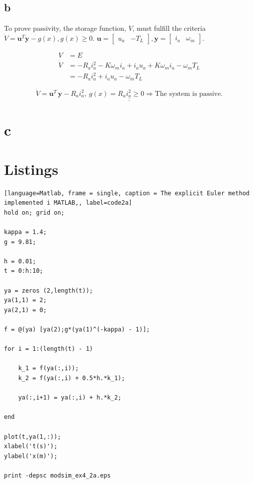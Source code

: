 \documentclass{article}
\begin{document}
\subsection{b}
To prove passivity, the storage function, $V$, must fulfill the criteria $\dot V = \mathbf{u}^T\mathbf{y} - g(x), g(x) \geq 0$. $\mathbf{u} = \begin{bmatrix} u_a & -T_L\end{bmatrix}, \mathbf{y} = \begin{bmatrix} i_a & \omega_m\end{bmatrix}$.

\begin{align*}
	V &= E\\
	\dot V &= -R_ai_a^2 - K\omega_mi_a + i_au_a+K\omega_mi_a - \omega_mT_L\\
	&= -R_ai_a^2 + i_au_a - \omega_mT_L
	
\end{align*}

\begin{equation*}
	\underline{\underline{\dot V =\mathbf{u}^T\,\mathbf{y} - R_ai_a^2, \: g(x) = R_ai_a^2 \geq 0 \Rightarrow \text{The system is passive.}}}
\end{equation*}

\section{c}


\section{Listings}


\begin{lstlisting}[language=Matlab, frame = single, caption = The explicit Euler method implemented i MATLAB,, label=code2a]
hold on; grid on;

kappa = 1.4;
g = 9.81;

h = 0.01;
t = 0:h:10;

ya = zeros (2,length(t));
ya(1,1) = 2;
ya(2,1) = 0;

f = @(ya) [ya(2);g*(ya(1)^(-kappa) - 1)];

for i = 1:(length(t) - 1)
    
    k_1 = f(ya(:,i));
    k_2 = f(ya(:,i) + 0.5*h.*k_1);
    
    ya(:,i+1) = ya(:,i) + h.*k_2;
    
end

plot(t,ya(1,:));
xlabel('t(s)');
ylabel('x(m)');

print -depsc modsim_ex4_2a.eps
\end{lstlisting}
\end{document}
